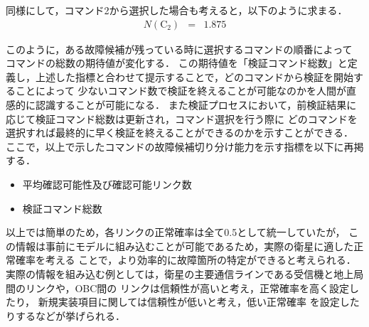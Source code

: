 \documentclass[11pt]{jsreport}
\begin{document}
同様にして，コマンド2から選択した場合も考えると，以下のように求まる．
\begin{eqnarray}
   N(\text{C}_2)  &=& 1.875 %
\end{eqnarray}

このように，ある故障候補が残っている時に選択するコマンドの順番によって
コマンドの総数の期待値が変化する．
この期待値を「検証コマンド総数」と定義し，上述した指標と合わせて提示することで，どのコマンドから検証を開始することによって
少ないコマンド数で検証を終えることが可能なのかを人間が直感的に認識することが可能になる．
また検証プロセスにおいて，前検証結果に応じて検証コマンド総数は更新され，コマンド選択を行う際に
どのコマンドを選択すれば最終的に早く検証を終えることができるのかを示すことができる．\\

ここで，以上で示したコマンドの故障候補切り分け能力を示す指標を以下に再掲する．
\begin{itemize}
   \item 平均確認可能性及び確認可能リンク数
   \item 検証コマンド総数
\end{itemize}

以上では簡単のため，各リンクの正常確率は全て0.5として統一していたが，
この情報は事前にモデルに組み込むことが可能であるため，実際の衛星に適した正常確率を考える
ことで，より効率的に故障箇所の特定ができると考えられる．
実際の情報を組み込む例としては，衛星の主要通信ラインである受信機と地上局間のリンクや，OBC間の
リンクは信頼性が高いと考え，正常確率を高く設定したり，
新規実装項目に関しては信頼性が低いと考え，低い正常確率
を設定したりするなどが挙げられる．
\end{document}
